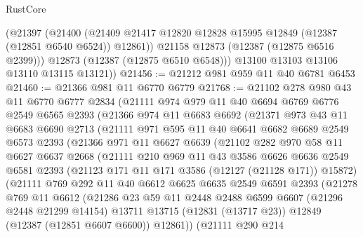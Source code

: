 \begin{lexlean}{RustCore}
\begin{coremodule}
          (@21397
            (@21400
              (@21409 @21417 @12820 @12828 @15995 @12849 (@12387 (@12851 @6540 @6524)) @12861))
            @21158
            @12873
            (@12387 (@12875 @6516 @2399)))
          @12873
          (@12387 (@12875 @6510 @6548)))
        @13100
        @13103
        @13106
        @13110
        @13115
        @13121))
@21456 := @21212 @981 @959 @11 @40 @6781 @6453
@21460 := @21366 @981 @11 @6770 @6779
@21768 := @21102
    @278
    @980
    @43
    @11
    @6770
    @6777
    @2834
    (@21111
      @974
      @979
      @11
      @40
      @6694
      @6769
      @6776
      @2549
      @6565
      @2393
      (@21366
        @974
        @11
        @6683
        @6692
        (@21371
          @973
          @43
          @11
          @6683
          @6690
          @2713
          (@21111
            @971
            @595
            @11
            @40
            @6641
            @6682
            @6689
            @2549
            @6573
            @2393
            (@21366
              @971
              @11
              @6627
              @6639
              (@21102
                @282
                @970
                @58
                @11
                @6627
                @6637
                @2668
                (@21111
                  @210
                  @969
                  @11
                  @43
                  @3586
                  @6626
                  @6636
                  @2549
                  @6581
                  @2393
                  (@21123 @171 @11 @171 @3586 (@12127 (@21128 @171)) @15872)
                  (@21111
                    @769
                    @292
                    @11
                    @40
                    @6612
                    @6625
                    @6635
                    @2549
                    @6591
                    @2393
                    (@21278
                      @769
                      @11
                      @6612
                      (@21286
                        @23
                        @59
                        @11
                        @2448
                        @2488
                        @6599
                        @6607
                        (@21296 @2448 @21299 @14154)
                        @13711
                        @13715
                        (@12831 (@13717 @23))
                        @12849
                        (@12387 (@12851 @6607 @6600))
                        @12861))
                    (@21111
                      @290
                      @214

\end{coremodule}
\end{lexlean}
